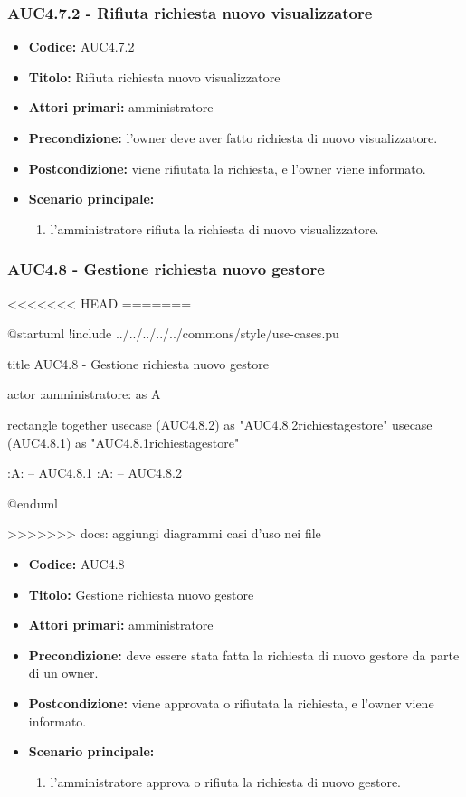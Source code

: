 \documentclass[casi-duso]{subfiles}
\begin{document}
\subsubsection{AUC4.7.2 - Rifiuta richiesta nuovo visualizzatore}%
\label{subsub:AUC4.7.2}
\begin{itemize}
  \item \textbf{Codice:} AUC4.7.2
  \item \textbf{Titolo:} Rifiuta richiesta nuovo visualizzatore
  \item \textbf{Attori primari:} amministratore
  \item \textbf{Precondizione:} l'owner deve aver fatto richiesta di nuovo visualizzatore.
  \item \textbf{Postcondizione:} viene rifiutata la richiesta, e l'owner viene informato.
  \item \textbf{Scenario principale:}
  \begin{enumerate}
    \item l'amministratore rifiuta la richiesta di nuovo visualizzatore.
  \end{enumerate}
\end{itemize}  

\subsubsection{AUC4.8 - Gestione richiesta nuovo gestore}%
\label{subsub:AUC4.8}
<<<<<<< HEAD
=======

\begin{plantuml}
@startuml
!include ../../../../../commons/style/use-cases.pu

title AUC4.8 - Gestione richiesta nuovo gestore

actor :amministratore: as A

rectangle {
  together {
    usecase (AUC4.8.2) as "AUC4.8.2\nRifiuta richiesta\nnuovo gestore"
    usecase (AUC4.8.1) as "AUC4.8.1\nAccetta richiesta\nnuovo gestore"
  }
}

:A: -- AUC4.8.1
:A: -- AUC4.8.2

@enduml
\end{plantuml}

>>>>>>> docs: aggiungi diagrammi casi d'uso nei file
\begin{itemize}
  \item \textbf{Codice:} AUC4.8
  \item \textbf{Titolo:} Gestione richiesta nuovo gestore
  \item \textbf{Attori primari:} amministratore
  \item \textbf{Precondizione:} deve essere stata fatta la richiesta di nuovo gestore da parte di un owner.
  \item \textbf{Postcondizione:} viene approvata o rifiutata la richiesta, e l'owner viene informato.
  \item \textbf{Scenario principale:}
  \begin{enumerate}
    \item l'amministratore approva o rifiuta la richiesta di nuovo gestore.
  \end{enumerate}
\end{itemize}
\end{document}
